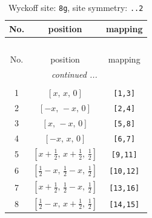 \documentclass[fleqn,8pt]{jsarticle}
\begin{document}
\renewcommand{\arraystretch}{1.2}
\begin{longtable}{ccc}
\caption{Wyckoff site: {\tt 8g}, site symmetry: {\tt ..2}}
 \\
 \hline \hline
No. & position & mapping \\ \hline \endfirsthead

\multicolumn{2}{l}{\tablename\ \thetable{}} \\
 \hline \hline
No. & position & mapping \\ \hline \endhead

 \hline \hline
\multicolumn{2}{r}{\footnotesize\it continued ...} \\ \endfoot

 \hline \hline
\multicolumn{2}{r}{} \\ \endlastfoot

1 & $\left[ x,\, x,\, 0 \right]$ & {\tt [1,3]} \\ \hline
2 & $\left[ - x,\, - x,\, 0 \right]$ & {\tt [2,4]} \\ \hline
3 & $\left[ x,\, - x,\, 0 \right]$ & {\tt [5,8]} \\ \hline
4 & $\left[ - x,\, x,\, 0 \right]$ & {\tt [6,7]} \\ \hline
5 & $\left[ x + \frac{1}{2},\, x + \frac{1}{2},\, \frac{1}{2} \right]$ & {\tt [9,11]} \\ \hline
6 & $\left[ \frac{1}{2} - x,\, \frac{1}{2} - x,\, \frac{1}{2} \right]$ & {\tt [10,12]} \\ \hline
7 & $\left[ x + \frac{1}{2},\, \frac{1}{2} - x,\, \frac{1}{2} \right]$ & {\tt [13,16]} \\ \hline
8 & $\left[ \frac{1}{2} - x,\, x + \frac{1}{2},\, \frac{1}{2} \right]$ & {\tt [14,15]} \\
\end{longtable}
\renewcommand{\arraystretch}{1.2}
\end{document}
